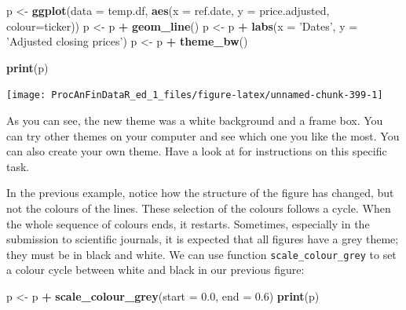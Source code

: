 \documentclass[11pt,]{book}
\newenvironment{Shaded}{\begin{snugshade}}{\end{snugshade}}
\newcommand{\KeywordTok}[1]{\textcolor[rgb]{0.27,0.27,0.27}{\textbf{#1}}}
\newcommand{\DataTypeTok}[1]{\textcolor[rgb]{0.27,0.27,0.27}{#1}}
\newcommand{\FloatTok}[1]{\textcolor[rgb]{0.06,0.06,0.06}{#1}}
\newcommand{\StringTok}[1]{\textcolor[rgb]{0.5,0.5,0.5}{#1}}
\newcommand{\OperatorTok}[1]{\textcolor[rgb]{0.81,0.36,0.00}{\textbf{#1}}}
\newcommand{\NormalTok}[1]{#1}
\begin{document}
\begin{Shaded}
\begin{Highlighting}[]
\NormalTok{p <-}\StringTok{ }\KeywordTok{ggplot}\NormalTok{(}\DataTypeTok{data =}\NormalTok{ temp.df, }\KeywordTok{aes}\NormalTok{(}\DataTypeTok{x =}\NormalTok{ ref.date, }
                                \DataTypeTok{y =}\NormalTok{ price.adjusted, }
                                \DataTypeTok{colour=}\NormalTok{ticker))}
\NormalTok{p <-}\StringTok{ }\NormalTok{p }\OperatorTok{+}\StringTok{ }\KeywordTok{geom_line}\NormalTok{()}
\NormalTok{p <-}\StringTok{ }\NormalTok{p }\OperatorTok{+}\StringTok{ }\KeywordTok{labs}\NormalTok{(}\DataTypeTok{x =} \StringTok{'Dates'}\NormalTok{, }\DataTypeTok{y =} \StringTok{'Adjusted closing prices'}\NormalTok{)}
\NormalTok{p <-}\StringTok{ }\NormalTok{p }\OperatorTok{+}\StringTok{ }\KeywordTok{theme_bw}\NormalTok{()}

\KeywordTok{print}\NormalTok{(p)}
\end{Highlighting}
\end{Shaded}

\begin{center}\texttt{[image: ProcAnFinDataR\_ed\_1\_files/figure-latex/unnamed-chunk-399-1]} \end{center}

As you can see, the new theme was a white background and a frame box.
You can try other themes on your computer and see which one you like the
most. You can also create your own theme. Have a look at
\citet{wickham2009ggplot2} for instructions on this specific task.

In the previous example, notice how the structure of the figure has
changed, but not the colours of the lines. These selection of the
colours follows a cycle. When the whole sequence of colours ends, it
restarts. Sometimes, especially in the submission to scientific
journals, it is expected that all figures have a grey theme; they must
be in black and white. We can use function \texttt{scale\_colour\_grey}
to set a colour cycle between white and black in our previous figure:

\begin{Shaded}
\begin{Highlighting}[]
\NormalTok{p <-}\StringTok{ }\NormalTok{p }\OperatorTok{+}\StringTok{ }\KeywordTok{scale_colour_grey}\NormalTok{(}\DataTypeTok{start =} \FloatTok{0.0}\NormalTok{, }\DataTypeTok{end =} \FloatTok{0.6}\NormalTok{)}
\KeywordTok{print}\NormalTok{(p)  }
\end{Highlighting}
\end{Shaded}
\end{document}
